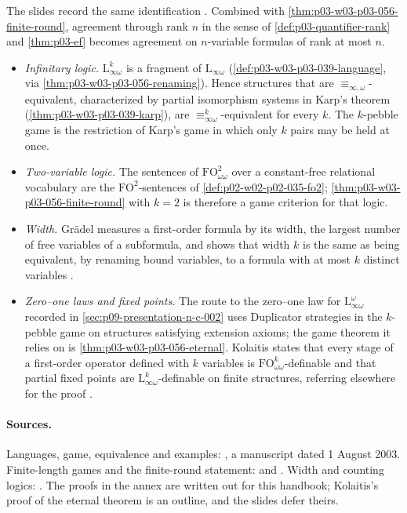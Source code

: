 The slides record the same identification
\cite[p.~11]{TechnionLMC2009Lecture4}. Combined with
\cref{thm:p03-w03-p03-056-finite-round}, agreement through rank \(n\) in the
sense of \cref{def:p03-quantifier-rank} and \cref{thm:p03-ef} becomes
agreement on \(n\)-variable formulas of rank at most \(n\).

\begin{itemize}
\item \emph{Infinitary logic.} \(\mathrm{L}^k_{\infty\omega}\) is a fragment of
      \(\mathrm{L}_{\infty\omega}\) (\cref{def:p03-w03-p03-039-language},
      via \cref{thm:p03-w03-p03-056-renaming}). Hence structures that are
      \(\equiv_{\infty,\omega}\)-equivalent, characterized by partial
      isomorphism systems in Karp's theorem
      (\cref{thm:p03-w03-p03-039-karp}), are
      \(\equiv^k_{\infty\omega}\)-equivalent for every \(k\). The
      \(k\)-pebble game is the restriction of Karp's game in which only
      \(k\) pairs may be held at once.
\item \emph{Two-variable logic.} The sentences of
      \(\mathrm{FO}^2_{\omega\omega}\) over a constant-free relational
      vocabulary are the \(\mathrm{FO}^2\)-sentences of
      \cref{def:p02-w02-p02-035-fo2}; \cref{thm:p03-w03-p03-056-finite-round}
      with \(k=2\) is therefore a game criterion for that logic.
\item \emph{Width.} Gr\"adel measures a first-order formula by its width, the
      largest number of free variables of a subformula, and shows that width
      \(k\) is the same as being equivalent, by renaming bound variables, to
      a formula with at most \(k\) distinct variables
      \cite[Lemma~3.1.4, p.~133]{Gradel2007FMTDescriptiveChapter}.
\item \emph{Zero--one laws and fixed points.} The route to the zero--one law
      for \(\mathrm{L}^\omega_{\infty\omega}\) recorded in
      \cref{sec:p09-presentation-n-c-002} uses Duplicator strategies in the
      \(k\)-pebble game on structures satisfying extension axioms; the
      game theorem it relies on is
      \cref{thm:p03-w03-p03-056-eternal}. Kolaitis states that every stage
      of a first-order operator defined with \(k\) variables is
      \(\mathrm{FO}^k_{\omega\omega}\)-definable and that partial fixed
      points are \(\mathrm{L}^k_{\infty\omega}\)-definable on finite
      structures, referring elsewhere for the proof
      \cite[Thm.~7.2, p.~54]{Kolaitis2003ExpressivePowerNotes}.
\end{itemize}

\paragraph{Sources.}
Languages, game, equivalence and examples:
\cite[pp.~3--4, 52--60]{Kolaitis2003ExpressivePowerNotes}, a manuscript
dated 1 August 2003. Finite-length games and the finite-round statement:
\cite[pp.~10--13]{TechnionLMC2009Lecture4} and
\cite[p.~2]{TechnionLMC2009Lecture5}. Width and counting logics:
\cite[pp.~133, 190]{Gradel2007FMTDescriptiveChapter}. The proofs in the annex
are written out for this handbook; Kolaitis's proof of the eternal theorem is
an outline, and the slides defer theirs.
